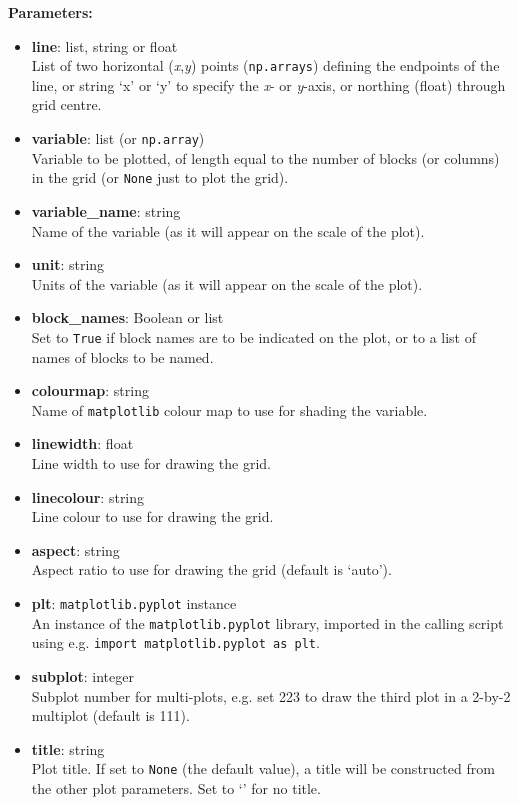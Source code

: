 \textbf{Parameters:}
\begin{itemize}
\item \textbf{line}: list, string or float\\
  List of two horizontal (\emph{x},\emph{y}) points (\texttt{np.arrays}) defining the endpoints of the line, or string `x' or `y' to specify the \emph{x}- or \emph{y}-axis, or northing (float) through grid centre.
\item \textbf{variable}: list (or \texttt{np.array})\\
  Variable to be plotted, of length equal to the number of blocks (or columns) in the grid (or \texttt{None} just to plot the grid).
\item \textbf{variable\_name}: string\\
  Name of the variable (as it will appear on the scale of the plot).
\item \textbf{unit}: string\\
  Units of the variable (as it will appear on the scale of the plot).
\item \textbf{block\_names}: Boolean or list\\
  Set to \texttt{True} if block names are to be indicated on the plot, or to a list of names of blocks to be named.
\item \textbf{colourmap}: string\\
  Name of \texttt{matplotlib} colour map to use for shading the variable.
\item \textbf{linewidth}: float\\
  Line width to use for drawing the grid.
\item \textbf{linecolour}: string\\
  Line colour to use for drawing the grid.
\item \textbf{aspect}: string\\
  Aspect ratio to use for drawing the grid (default is `auto').
\item \textbf{plt}: \texttt{matplotlib.pyplot} instance\\
  An instance of the \texttt{matplotlib.pyplot} library, imported in the calling script using e.g. \texttt{import matplotlib.pyplot as plt}.
\item \textbf{subplot}: integer\\
  Subplot number for multi-plots, e.g. set 223 to draw the third plot in a 2-by-2 multiplot (default is 111).
\item \textbf{title}: string\\
  Plot title.  If set to \texttt{None} (the default value), a title will be constructed from the other plot parameters.  Set to `' for no title.

\end{itemize}
